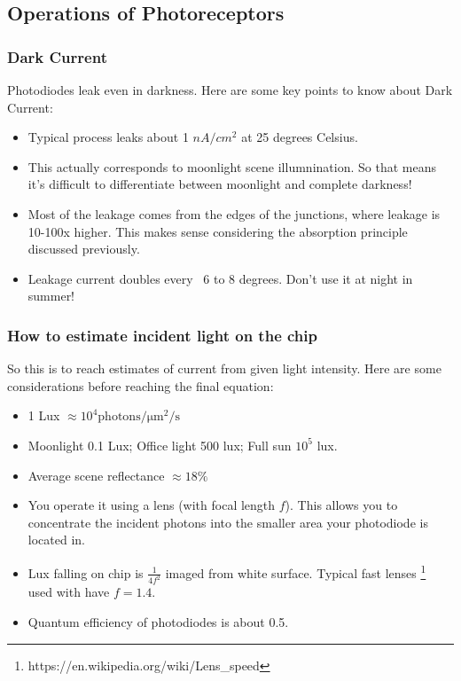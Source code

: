 \subsection{Operations of Photoreceptors}

\subsubsection{Dark Current}

Photodiodes leak even in darkness. Here are some key points to know about Dark Current:
\begin{itemize}
    \item Typical process leaks about 1 $nA/cm^2$ at 25 degrees Celsius.
    \item This actually corresponds to moonlight scene illumnination. So that means it's difficult to differentiate between moonlight and complete darkness!
    \item Most of the leakage comes from the edges of the junctions, where leakage is 10-100x higher. This makes sense considering the absorption principle discussed previously. 
    \item Leakage current doubles every ~6 to 8 degrees. Don't use it at night in summer!
\end{itemize}

\subsubsection{How to estimate incident light on the chip}

So this is to reach estimates of current from given light intensity. Here are some considerations before reaching the final equation: 

\begin{itemize}
    \item 1 Lux $\approx 10^4 \mathrm{photons/\mu m^2/s}$
    \item Moonlight 0.1 Lux; Office light 500 lux; Full sun $10^5$ lux.
    \item Average scene reflectance $\approx 18\%$
    \item You operate it using a lens (with focal length $f$). This allows you to concentrate the incident photons into the smaller area your photodiode is located in.   
    \item Lux falling on chip is $\frac{1}{4 f^2}$ imaged from white surface. Typical fast lenses \footnote{https://en.wikipedia.org/wiki/Lens_speed} used with have $f = 1.4$.
    \item Quantum efficiency of photodiodes is about 0.5.
\end{itemize}

